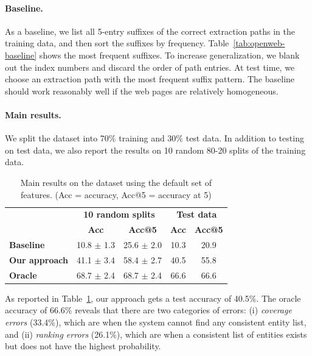 \paragraph{Baseline.}
As a baseline,
we list all 5-entry
suffixes of the correct extraction paths
in the training data,
and then sort the suffixes by frequency.
Table~\ref{tab:openweb-baseline}
shows the most frequent suffixes.
To increase generalization,
we blank out the index numbers
and discard the order of path entries.
At test time,
we choose an extraction path with the most
frequent suffix pattern.
The baseline should work reasonably well
if the web pages are relatively homogeneous.

\paragraph{Main results.}
We split the dataset into 70\% training and 30\% test data.
In addition to testing on test data,
we also report the results on 10 random 80-20 splits
of the training data.

\begin{table}[t]
\centering
\begin{tabular}{lcccc} \toprule
& \multicolumn{2}{c}{\bf 10 random splits} & \multicolumn{2}{c}{\bf Test data} \\
& \textbf{Acc} & \textbf{Acc@5} & \textbf{Acc} & \textbf{Acc@5} \\ \midrule
\textbf{Baseline} & 10.8 $\pm$ 1.3 & 25.6 $\pm$ 2.0 & 10.3 & 20.9 \\
\textbf{Our approach} & 41.1 $\pm$ 3.4 & 58.4 $\pm$ 2.7 & 40.5 & 55.8 \\
\textbf{Oracle} & 68.7 $\pm$ 2.4 & 68.7 $\pm$ 2.4 & 66.6 & 66.6 \\ \bottomrule
\end{tabular}
\caption[
Main results on the  dataset.
]{Main results on the  dataset
using the default set of features.
(Acc = accuracy, Acc@5 = accuracy at 5)}
\label{tab:openweb-main-results}
\end{table}

As reported in
Table~\ref{tab:openweb-main-results},
our approach gets a test accuracy of 40.5\%.
The oracle accuracy of 66.6\% reveals that there are
two categories of errors:
(i) \emph{coverage errors} (33.4\%),
which are when the system cannot find any
consistent entity list,
and (ii) \emph{ranking errors} (26.1\%),
which are when a consistent list of entities
exists but does not have the highest probability.

